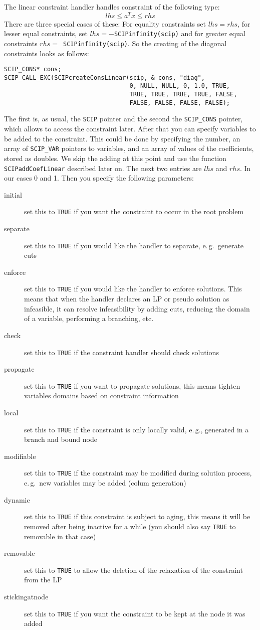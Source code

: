 \documentclass[a4paper]{article}
\begin{document}
The linear constraint handler handles constraint of the following type:
\[
lhs \leq a^T x \leq rhs
\]
There are three special cases of these: For equality constraints set $lhs = rhs$, for lesser equal constraints, set $lhs = -$\verb+SCIPinfinity(scip)+ and for greater equal constraints $rhs = $~\verb+SCIPinfinity(scip)+. So the creating of the diagonal constraints looks as follows:
\begin{verbatim}
SCIP_CONS* cons;
SCIP_CALL_EXC(SCIPcreateConsLinear(scip, & cons, "diag",
                                   0, NULL, NULL, 0, 1.0, TRUE,
                                   TRUE, TRUE, TRUE, TRUE, FALSE,
                                   FALSE, FALSE, FALSE, FALSE);
\end{verbatim}
The first is, as usual, the \verb+SCIP+ pointer and the second the \verb+SCIP_CONS+ pointer, which allows to access the constraint later. After that you can specify variables to be added to the constraint. This could be done by specifying the number, an array of \verb+SCIP_VAR+ pointers to variables, and an array of values of the coefficients, stored as doubles. We skip the adding at this point and use the function \verb+SCIPaddCoefLinear+ described later on. The next two entries are $lhs$ and $rhs$. In our cases 0 and 1. Then you specify the following parameters:
\begin{description}
\item[initial] set this to \verb+TRUE+ if you want the constraint to occur in the root problem
\item[separate] set this to \verb+TRUE+ if you would like the handler to separate, e.\,g.\ generate cuts
\item[enforce] set this to \verb+TRUE+ if you would  like the handler to enforce solutions. This means that when the handler declares an LP or pseudo solution as infeasible, it can resolve infeasibility by adding cuts, reducing the domain of a variable, performing a branching, etc.
\item[check] set this to \verb+TRUE+ if the constraint handler should check solutions
\item[propagate] set this to \verb+TRUE+ if you want to propagate solutions, this means tighten variables domains based on constraint information
\item[local] set this to \verb+TRUE+ if the constraint is only locally valid, e.\,g., generated in a branch and bound node
\item[modifiable] set this to \verb+TRUE+ if the constraint may be modified during solution process,  e.\,g.\ new variables may be added (colum generation)
\item[dynamic] set this to \verb+TRUE+ if this constraint is subject to aging, this means it will be removed after being inactive for a while (you should also say \verb+TRUE+ to removable in that  case)
\item[removable] set this to \verb+TRUE+ to allow the deletion of the relaxation of the  constraint from the LP
\item[stickingatnode] set this to \verb+TRUE+ if you want the constraint to be kept at the node it was added
\end{description}
\end{document}
